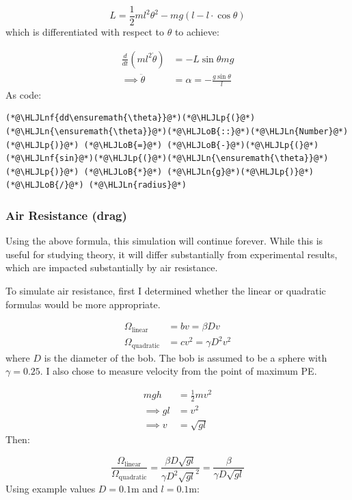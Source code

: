\documentclass[12pt,a4paper]{article}
\newcommand{\HLJLn}[1]{#1}
\newcommand{\HLJLnf}[1]{\textcolor[RGB]{66,102,213}{#1}}
\newcommand{\HLJLoB}[1]{\textcolor[RGB]{102,102,102}{\textbf{#1}}}
\newcommand{\HLJLp}[1]{#1}
\begin{document}
\[
L = \frac{1}{2} ml^2\theta^2 - mg(l - l \cdot \cos \theta)
\]
which is differentiated with respect to $\theta$ to achieve:


\begin{align*}
    \frac{d}{dt}\left(ml^2\dot\theta\right) &= -L \sin\theta mg \\
    \implies \ddot\theta &= \alpha = -\frac{g\sin\theta}{l}
\end{align*}
As code:


\begin{lstlisting}
(*@\HLJLnf{dd\ensuremath{\theta}}@*)(*@\HLJLp{(}@*)(*@\HLJLn{\ensuremath{\theta}}@*)(*@\HLJLoB{::}@*)(*@\HLJLn{Number}@*)(*@\HLJLp{)}@*) (*@\HLJLoB{=}@*) (*@\HLJLoB{-}@*)(*@\HLJLp{(}@*)(*@\HLJLnf{sin}@*)(*@\HLJLp{(}@*)(*@\HLJLn{\ensuremath{\theta}}@*)(*@\HLJLp{)}@*) (*@\HLJLoB{*}@*) (*@\HLJLn{g}@*)(*@\HLJLp{)}@*) (*@\HLJLoB{/}@*) (*@\HLJLn{radius}@*)
\end{lstlisting}

\subsubsection{Air Resistance (drag)}
Using the above formula, this simulation will continue forever. While this is useful for studying theory, it will differ substantially from experimental results, which are impacted substantially by air resistance.

To simulate air resistance, first I determined whether the linear or quadratic formulas would be more appropriate.


\begin{align*}
\Omega_{\mathrm{linear}} &= bv = \ensuremath{\beta}Dv \\
\Omega_{\mathrm{quadratic}} &= cv^2 = \gamma D^2 v^2
\end{align*}
where $D$ is the diameter of the bob. The bob is assumed to be a sphere with $\gamma = 0.25$. I also chose to measure velocity from the point of maximum PE.


\begin{align*}
mgh &= \frac{1}{2} mv^2 \\
\implies gl &= v^2 \\
\implies v &= \sqrt{gl}
\end{align*}
Then:

\[
\frac{\Omega_{\mathrm{linear}}}{\Omega_{\mathrm{quadratic}}}
= \frac{\beta D \sqrt{gl}}{\gamma D^2 \sqrt{gl}^2}
= \frac{\beta}{\gamma D \sqrt{gl}}
\]
Using example values $D = 0.1\mathrm{m}$ and $l = 0.1\mathrm{m}$:
\end{document}

